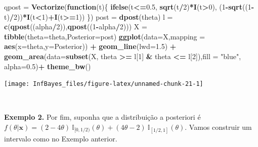 \documentclass[
]{book}
\newenvironment{Shaded}{\begin{snugshade}}{\end{snugshade}}
\newcommand{\ControlFlowTok}[1]{\textcolor[rgb]{0.13,0.29,0.53}{\textbf{#1}}}
\newcommand{\DataTypeTok}[1]{\textcolor[rgb]{0.13,0.29,0.53}{#1}}
\newcommand{\DecValTok}[1]{\textcolor[rgb]{0.00,0.00,0.81}{#1}}
\newcommand{\FloatTok}[1]{\textcolor[rgb]{0.00,0.00,0.81}{#1}}
\newcommand{\KeywordTok}[1]{\textcolor[rgb]{0.13,0.29,0.53}{\textbf{#1}}}
\newcommand{\NormalTok}[1]{#1}
\newcommand{\OperatorTok}[1]{\textcolor[rgb]{0.81,0.36,0.00}{\textbf{#1}}}
\newcommand{\StringTok}[1]{\textcolor[rgb]{0.31,0.60,0.02}{#1}}
\begin{document}
\begin{Shaded}
\begin{Highlighting}[]
\NormalTok{qpost =}\StringTok{ }\KeywordTok{Vectorize}\NormalTok{(}\ControlFlowTok{function}\NormalTok{(t)\{ }\KeywordTok{ifelse}\NormalTok{(t}\OperatorTok{<=}\FloatTok{0.5}\NormalTok{, }\KeywordTok{sqrt}\NormalTok{(t}\OperatorTok{/}\DecValTok{2}\NormalTok{)}\OperatorTok{*}\KeywordTok{I}\NormalTok{(t}\OperatorTok{>}\DecValTok{0}\NormalTok{),}
\NormalTok{    (}\DecValTok{1}\OperatorTok{-}\KeywordTok{sqrt}\NormalTok{((}\DecValTok{1}\OperatorTok{-}\NormalTok{t)}\OperatorTok{/}\DecValTok{2}\NormalTok{))}\OperatorTok{*}\KeywordTok{I}\NormalTok{(t}\OperatorTok{<}\DecValTok{1}\NormalTok{)}\OperatorTok{+}\KeywordTok{I}\NormalTok{(t}\OperatorTok{>=}\DecValTok{1}\NormalTok{)) \})}
\NormalTok{post =}\StringTok{ }\KeywordTok{dpost}\NormalTok{(theta)}
\NormalTok{l =}\StringTok{ }\KeywordTok{c}\NormalTok{(}\KeywordTok{qpost}\NormalTok{((alpha}\OperatorTok{/}\DecValTok{2}\NormalTok{)),}\KeywordTok{qpost}\NormalTok{((}\DecValTok{1}\OperatorTok{-}\NormalTok{alpha}\OperatorTok{/}\DecValTok{2}\NormalTok{)))}
\NormalTok{X =}\StringTok{ }\KeywordTok{tibble}\NormalTok{(}\DataTypeTok{theta=}\NormalTok{theta,}\DataTypeTok{Posterior=}\NormalTok{post)}
\KeywordTok{ggplot}\NormalTok{(}\DataTypeTok{data=}\NormalTok{X,}\DataTypeTok{mapping =} \KeywordTok{aes}\NormalTok{(}\DataTypeTok{x=}\NormalTok{theta,}\DataTypeTok{y=}\NormalTok{Posterior)) }\OperatorTok{+}
\StringTok{  }\KeywordTok{geom_line}\NormalTok{(}\DataTypeTok{lwd=}\FloatTok{1.5}\NormalTok{) }\OperatorTok{+}
\StringTok{  }\KeywordTok{geom_area}\NormalTok{(}\DataTypeTok{data=}\KeywordTok{subset}\NormalTok{(X, theta }\OperatorTok{>=}\StringTok{ }\NormalTok{l[}\DecValTok{1}\NormalTok{] }\OperatorTok{&}\StringTok{ }\NormalTok{theta }\OperatorTok{<=}\StringTok{ }\NormalTok{l[}\DecValTok{2}\NormalTok{]),}\DataTypeTok{fill =} \StringTok{"blue"}\NormalTok{, }\DataTypeTok{alpha=}\FloatTok{0.5}\NormalTok{)}\OperatorTok{+}
\StringTok{  }\KeywordTok{theme_bw}\NormalTok{()}
\end{Highlighting}
\end{Shaded}

\begin{center}\texttt{[image: InfBayes\_files/figure-latex/unnamed-chunk-21-1]} \end{center}

\(~\)

\textbf{Exemplo 2.} Por fim, suponha que a distribuição a posteriori é \(f(\theta|\boldsymbol{x})=(2-4\theta)~\mathbb{I}_{[0,1/2)}(\theta)+(4\theta-2)~\mathbb{I}_{[1/2,1]}(\theta)\). Vamos construir um intervalo como no Exemplo anterior.
\end{document}
